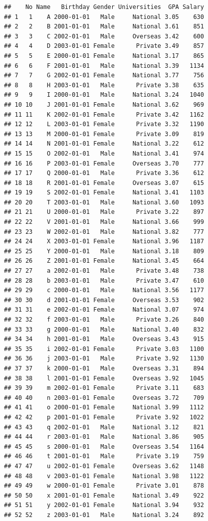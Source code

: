 \documentclass[
]{book}
\begin{document}
\begin{verbatim}
##    No Name   Birthday Gender Universities  GPA Salary
## 1   1    A 2000-01-01   Male     National 3.05    630
## 2   2    B 2001-01-01   Male     National 3.61    851
## 3   3    C 2002-01-01   Male     Overseas 3.42    600
## 4   4    D 2003-01-01 Female      Private 3.49    857
## 5   5    E 2000-01-01 Female     National 3.17    865
## 6   6    F 2001-01-01   Male     National 3.39   1134
## 7   7    G 2002-01-01 Female     National 3.77    756
## 8   8    H 2003-01-01   Male      Private 3.38    635
## 9   9    I 2000-01-01   Male     National 3.24   1040
## 10 10    J 2001-01-01 Female     National 3.62    969
## 11 11    K 2002-01-01 Female      Private 3.42   1162
## 12 12    L 2003-01-01 Female      Private 3.32   1190
## 13 13    M 2000-01-01 Female      Private 3.09    819
## 14 14    N 2001-01-01 Female     National 3.22    612
## 15 15    O 2002-01-01   Male     National 3.41    974
## 16 16    P 2003-01-01 Female     Overseas 3.70    777
## 17 17    Q 2000-01-01   Male      Private 3.36    612
## 18 18    R 2001-01-01 Female     Overseas 3.07    615
## 19 19    S 2002-01-01 Female     National 3.41   1103
## 20 20    T 2003-01-01   Male     National 3.60   1093
## 21 21    U 2000-01-01   Male      Private 3.22    897
## 22 22    V 2001-01-01   Male     National 3.66    999
## 23 23    W 2002-01-01   Male     National 3.82    777
## 24 24    X 2003-01-01 Female     National 3.96   1187
## 25 25    Y 2000-01-01   Male     National 3.18    809
## 26 26    Z 2001-01-01 Female     National 3.45    664
## 27 27    a 2002-01-01   Male      Private 3.48    738
## 28 28    b 2003-01-01   Male      Private 3.47    610
## 29 29    c 2000-01-01   Male     National 3.56   1177
## 30 30    d 2001-01-01 Female     Overseas 3.53    902
## 31 31    e 2002-01-01 Female     National 3.07    974
## 32 32    f 2003-01-01   Male      Private 3.26    840
## 33 33    g 2000-01-01   Male     National 3.40    832
## 34 34    h 2001-01-01   Male     Overseas 3.43    915
## 35 35    i 2002-01-01 Female      Private 3.03   1100
## 36 36    j 2003-01-01   Male      Private 3.92   1130
## 37 37    k 2000-01-01   Male     Overseas 3.31    894
## 38 38    l 2001-01-01 Female     Overseas 3.92   1045
## 39 39    m 2002-01-01 Female      Private 3.11    683
## 40 40    n 2003-01-01 Female     Overseas 3.72    709
## 41 41    o 2000-01-01 Female     National 3.99   1112
## 42 42    p 2001-01-01 Female      Private 3.92   1022
## 43 43    q 2002-01-01   Male     National 3.12    821
## 44 44    r 2003-01-01   Male     National 3.86    905
## 45 45    s 2000-01-01   Male     Overseas 3.54   1164
## 46 46    t 2001-01-01   Male      Private 3.19    759
## 47 47    u 2002-01-01 Female     Overseas 3.62   1148
## 48 48    v 2003-01-01 Female     National 3.98   1122
## 49 49    w 2000-01-01 Female      Private 3.01    878
## 50 50    x 2001-01-01 Female     National 3.49    922
## 51 51    y 2002-01-01 Female     National 3.94    932
## 52 52    z 2003-01-01   Male     National 3.24    892
\end{verbatim}
\end{document}

